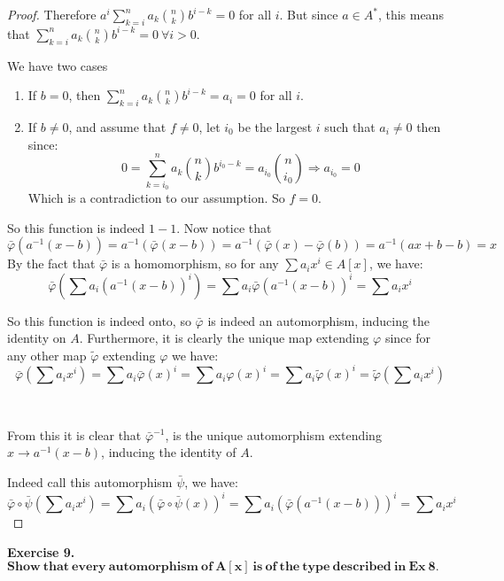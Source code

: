 \documentclass{article}
\theoremstyle{definition}
\theoremstyle{remark}
\theoremstyle{definition}
\begin{document}
\begin{proof}
Therefore ${a^i}\sum_{k=i}^n{a_k}\binom{n}{k}b^{i-k} = 0$ for all $i$. But since $a\in A^\ast$, this means that $\sum_{k=i}^n{a_k}\binom{n}{k}b^{i-k} = 0 \ \forall i>0$.

We have two cases\begin{enumerate}
    \item If $b=0$, then $\sum_{k=i}^n{a_k}\binom{n}{k}b^{i-k} = a_i = 0$ for all $i$.
    \item If $b\not=0$, and assume that $f\not=0$, let $i_0$ be the largest $i$ such that $a_{i} \not= 0$ then since: \begin{equation}0=\sum_{k=i_0}^n{a_k}\binom{n}{k}b^{i_0-k}=a_{i_0}\binom{n}{i_0} \Rightarrow a_{i_0}=0\end{equation}
Which is a contradiction to our assumption. So $f=0$.
\end{enumerate}

So this function is indeed $1-1$. Now notice that \[\bar\varphi(a^{-1}(x-b)) = a^{-1}(\bar\varphi(x-b)) = a^{-1}(\bar\varphi(x)-\bar\varphi(b)) = a^{-1}(ax+b-b) = x\]
By the fact that $\bar\varphi$ is a homomorphism, so for any $\sum {a_i}x^i\in A[x]$, we have:\begin{equation}
    \bar\varphi(\sum {a_i}{(a^{-1}(x-b))}^i) = \sum {a_i}{\bar\varphi(a^{-1}(x-b))}^i = \sum a_i x^i 
\end{equation}

So this function is indeed onto, so $\bar\varphi$ is indeed an automorphism, inducing the identity on $A$. Furthermore, it is clearly the unique map extending $\varphi$ since for any other map $\tilde{\varphi}$ extending $\varphi$ we have:\begin{equation}
    \bar\varphi(\sum {a_i}x^i) = \sum {a_i}{\bar\varphi(x)}^i = \sum {a_i}{\varphi(x)}^i = \sum {a_i}{\tilde\varphi(x)}^i = \tilde\varphi(\sum {a_i}{x}^i)
\end{equation}

\

From this it is clear that $\bar\varphi^{-1}$, is the unique automorphism extending $x\rightarrow a^{-1}(x-b)$, inducing the identity of $A$.

Indeed call this automorphism $\bar\psi$, we have:\begin{equation}
    \bar\varphi\circ\bar\psi(\sum {a_i}x^i) = \sum {a_i} {(\bar\varphi\circ\bar\psi(x))}^i = \sum {a_i} {(\bar\varphi(a^{-1}(x-b)))}^i = \sum {a_i} {x}^i 
\end{equation}
    \end{proof}
    \textbf{Exercise 9. }$\mathbf{Show\ that\ every\ automorphism\ of\ A[x]\ is\ of\ the\ type\ described\ in\ Ex \ 8.}$
\end{document}
